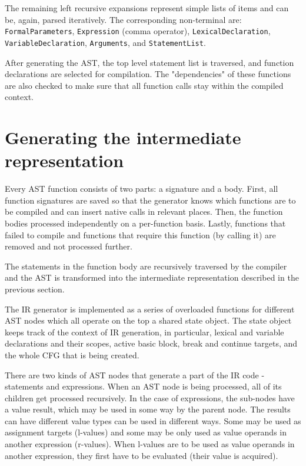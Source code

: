 The remaining left recursive expansions represent simple lists of items and can be, again, parsed iteratively. The corresponding non-terminal are: \texttt{FormalParameters}, \texttt{Expression} (comma operator), \texttt{LexicalDeclaration}, \texttt{VariableDeclaration}, \texttt{Arguments}, and \texttt{StatementList}.

After generating the AST, the top level statement list is traversed, and function declarations are selected for compilation. The "dependencies" of these functions are also checked to make sure that all function calls stay within the compiled context.


\section{Generating the intermediate representation}

Every AST function consists of two parts: a signature and a body. First, all function signatures are saved so that the generator knows which functions are to be compiled and can insert native calls in relevant places. Then, the function bodies processed independently on a per-function basis. Lastly, functions that failed to compile and functions that require this function (by calling it) are removed and not processed further.

The statements in the function body are recursively traversed by the compiler and the AST is transformed into the intermediate representation described in the previous section.

The IR generator is implemented as a series of overloaded functions for different AST nodes which all operate on the top a shared state object. The state object keeps track of the context of IR generation, in particular, lexical and variable declarations and their scopes, active basic block, break and continue targets, and the whole CFG that is being created.


There are two kinds of AST nodes that generate a part of the IR code - statements and expressions. When an AST node is being processed, all of its children get processed recursively. In the case of expressions, the sub-nodes have a value result, which may be used in some way by the parent node. The results can have different value types can be used in different ways. Some may be used as assignment targets (l-values) and some may be only used as value operands in another expression (r-values). When l-values are to be used as value operands in another expression, they first have to be evaluated (their value is acquired).

